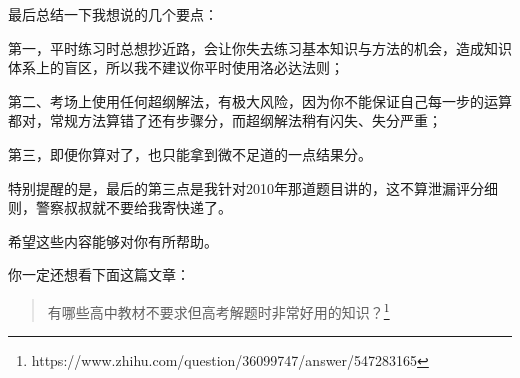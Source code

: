 
最后总结一下我想说的几个要点：

第一，平时练习时总想抄近路，会让你失去练习基本知识与方法的机会，造成知识体系上的盲区，所以我不建议你平时使用洛必达法则；

第二、考场上使用任何超纲解法，有极大风险，因为你不能保证自己每一步的运算都对，常规方法算错了还有步骤分，而超纲解法稍有闪失、失分严重；

第三，即便你算对了，也只能拿到微不足道的一点结果分。

特别提醒的是，最后的第三点是我针对2010年那道题目讲的，这不算泄漏评分细则，警察叔叔就不要给我寄快递了。

希望这些内容能够对你有所帮助。

你一定还想看下面这篇文章：
\begin{quote}
  有哪些高中教材不要求但高考解题时非常好用的知识？\footnote{https://www.zhihu.com/question/36099747/answer/547283165}
\end{quote}

